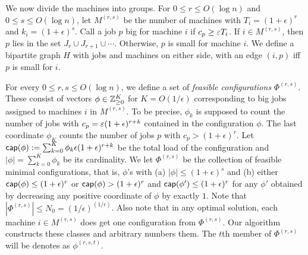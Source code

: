 We now divide the machines into groups. For $0\leq r\leq O(\log n)$ and $0\leq s\leq O(\log n)$, let $M^{(r,s)}$ be the number of machines with $T_i = (1+\epsilon)^r$ and $k_i = (1+\epsilon)^s$.
%
\def\sm{\mathsf{small}}
Call a job $p$  big  for machine $i$ if $c_p \geq \varepsilon T_i$. If $i\in M^{(r,s)}$, then $p$ lies in the set $J_r \cup J_{r+1} \cup \cdots$.
Otherwise, $p$ is small for machine $i$.
We define a bipartite graph $H$ with jobs and machines on either side, with an edge $(i,p)$ iff $p$ is small for $i$. 

For every $0\leq r,s \leq O(\log n)$, we define a set of {\em feasible configurations} $\Phi^{(r,s)}$. These consist of vectors $\phi \in {\mathbb Z}^K_{\geq 0}$ for $K=O(1/\epsilon)$ corresponding to big jobs assigned to machines $i$ in $M^{(r,s)}$.
To be precise, $\phi_k$ is supposed to count the number of jobs with $c_p = \varepsilon (1+\epsilon)^{r+k}$ contained in the configuration $\phi$. 
The last coordinate $\phi_K$ counts the number of jobs $p$ with $c_p > (1+\epsilon)^r$.
Let
$\mathsf{cap}(\phi) := \sum_{k=0}^K \phi_k \epsilon(1+\epsilon)^{r+k}$ be the total load of the configuration and $|\phi| = \sum_{k=0}^K \phi_k$ be its cardinality.
We let $\Phi^{(r,s)}$ be the collection of feasible minimal configurations, that is, $\phi$'s with (a) $|\phi|\leq (1+\epsilon)^s$ and (b) either $\mathsf{cap}(\phi)\leq (1+\epsilon)^r$ or $\mathsf{cap}(\phi) > (1+\epsilon)^r$ and $\mathsf{cap}(\phi') \leq (1+\epsilon)^r$ for any $\phi'$ obtained by decreasing any positive coordinate of $\phi$ by exactly $1$. Note that $|\Phi^{(r,s)}| \leq N_0 = (1/\epsilon)^{(1/\epsilon)}$. Also note that in any optimal solution, each machine $i\in M^{(r,s)}$ does get one configuration from $\Phi^{(r,s)}$. 
Our algorithm constructs these classes and arbitrary numbers them. The $t$th member of $\Phi^{(r,s)}$ will be denotes as $\phi^{(r,s,t)}$.%

